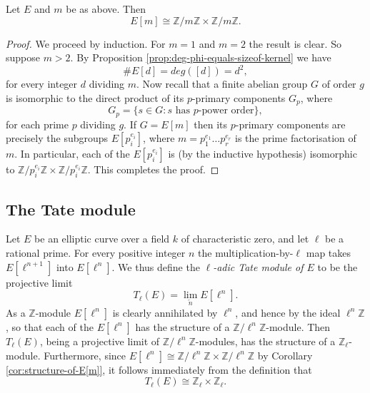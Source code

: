 \begin{cor}
  \label{cor:structure-of-E[m]}
  Let $E$ and $m$ be as above.  Then
  \begin{equation*}
    E[m] \cong \mathbb{Z} / m \mathbb{Z} \times \mathbb{Z} / m \mathbb{Z}.
  \end{equation*}
\end{cor}
\begin{proof}
  We proceed by induction.  For $m = 1$ and $m = 2$ the result is clear.  So suppose $m > 2$.  By
  Proposition \ref{prop:deg-phi-equals-sizeof-kernel} we have
  \begin{equation*}
    \# E[d] = deg([d]) = d^{2},
  \end{equation*}
  for every integer $d$ dividing $m$.  Now recall that a finite abelian group $G$ of
  order $g$ is isomorphic to the direct product of its $p$-primary components
  $G_{p}$, where
  \begin{equation*}
    G_{p} = \{ s \in G : s \text{ has } p \text{-power order} \},
  \end{equation*}
  for each prime $p$ dividing $g$.  If $G = E[m]$ then its $p$-primary components are
  precisely the subgroups $E[p_{i}^{e_{i}}]$, where $m = p_{1}^{e_{1}} \ldots
  p_{r}^{e_{r}}$ is the prime factorisation of $m$.  In particular, each of the
  $E[p_{i}^{e_{i}}]$ is (by the inductive hypothesis) isomorphic to $\mathbb{Z} /
  p_{i}^{e_{i}} \mathbb{Z} \times \mathbb{Z} / p_{i}^{e_{i}} \mathbb{Z}$.  This
  completes the proof.
\end{proof}

\subsection{The Tate module}
\label{sec:tate-module}

Let $E$ be an elliptic curve over a field $k$ of characteristic zero, and let $\ell$
be a rational prime.  For every positive integer $n$ the multiplication-by-$\ell$ map
takes $E[\ell^{n+1}]$ into $E[\ell^{n}]$.  We thus define the \emph{$\ell$-adic Tate
  module of $E$} to be the projective limit
\begin{equation*}
  T_{\ell}(E) =  \lim_{\overleftarrow{n}} E[\mathcal{\ell}^{n}].
\end{equation*}
As a $\mathbb{Z}$-module $E[\ell^{n}]$ is clearly annihilated by $\ell^{n}$, and
hence by the ideal $\ell^{n}\mathbb{Z}$, so that each of the $E[\ell^{n}]$ has the
structure of a $\mathbb{Z}/\ell^{n}\mathbb{Z}$-module.  Then $T_{\ell}(E)$, being a
projective limit of $\mathbb{Z}/\ell^{n}\mathbb{Z}$-modules, has the structure of a
$\mathbb{Z}_{\ell}$-module.  Furthermore, since $E[\ell^{n}] \cong
\mathbb{Z}/\ell^{n}\mathbb{Z} \times \mathbb{Z}/\ell^{n}\mathbb{Z}$ by Corollary
\ref{cor:structure-of-E[m]}, it follows immediately from the definition that
\begin{equation}
  \label{eq:structure-of-Tate-module}
  T_{\ell}(E) \cong \mathbb{Z}_{\ell} \times \mathbb{Z}_{\ell}.
\end{equation}

